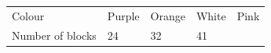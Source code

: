\begin{enumerate}[noitemsep, label=\textbf{\arabic*}. ]
{\begin{tabular}[t]{|l|l|l|l|l|}
    
        Colour &
    
    
        Purple &
    
    
        Orange &
    
    
        White &
    
    
        Pink%
     \tabularnewline\cline{1-1}\cline{2-2}\cline{3-3}\cline{4-4}\cline{5-5}
    
    
        Number of
blocks &
    
    
        24 &
    
    
        32 &
    
    
        41 &
    

\end{tabular}}
\end{enumerate}
